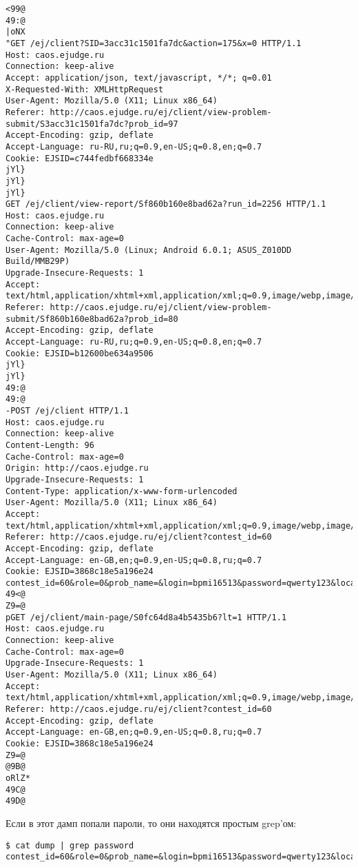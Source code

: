 \documentclass{article}
\begin{document}
\begin{verbatim}
<99@
49:@
|oNX
"GET /ej/client?SID=3acc31c1501fa7dc&action=175&x=0 HTTP/1.1
Host: caos.ejudge.ru
Connection: keep-alive
Accept: application/json, text/javascript, */*; q=0.01
X-Requested-With: XMLHttpRequest
User-Agent: Mozilla/5.0 (X11; Linux x86_64) 
Referer: http://caos.ejudge.ru/ej/client/view-problem-submit/S3acc31c1501fa7dc?prob_id=97
Accept-Encoding: gzip, deflate
Accept-Language: ru-RU,ru;q=0.9,en-US;q=0.8,en;q=0.7
Cookie: EJSID=c744fedbf668334e
jYl}
jYl}
jYl}
GET /ej/client/view-report/Sf860b160e8bad62a?run_id=2256 HTTP/1.1
Host: caos.ejudge.ru
Connection: keep-alive
Cache-Control: max-age=0
User-Agent: Mozilla/5.0 (Linux; Android 6.0.1; ASUS_Z010DD Build/MMB29P)
Upgrade-Insecure-Requests: 1
Accept: text/html,application/xhtml+xml,application/xml;q=0.9,image/webp,image/apng,*/*;q=0.8
Referer: http://caos.ejudge.ru/ej/client/view-problem-submit/Sf860b160e8bad62a?prob_id=80
Accept-Encoding: gzip, deflate
Accept-Language: ru-RU,ru;q=0.9,en-US;q=0.8,en;q=0.7
Cookie: EJSID=b12600be634a9506
jYl}
jYl}
49:@
49:@
-POST /ej/client HTTP/1.1
Host: caos.ejudge.ru
Connection: keep-alive
Content-Length: 96
Cache-Control: max-age=0
Origin: http://caos.ejudge.ru
Upgrade-Insecure-Requests: 1
Content-Type: application/x-www-form-urlencoded
User-Agent: Mozilla/5.0 (X11; Linux x86_64) 
Accept: text/html,application/xhtml+xml,application/xml;q=0.9,image/webp,image/apng,*/*;q=0.8
Referer: http://caos.ejudge.ru/ej/client?contest_id=60
Accept-Encoding: gzip, deflate
Accept-Language: en-GB,en;q=0.9,en-US;q=0.8,ru;q=0.7
Cookie: EJSID=3868c18e5a196e24
contest_id=60&role=0&prob_name=&login=bpmi16513&password=qwerty123&locale_id=0&action_2=Log+in
49<@
Z9=@
pGET /ej/client/main-page/S0fc64d8a4b5435b6?lt=1 HTTP/1.1
Host: caos.ejudge.ru
Connection: keep-alive
Cache-Control: max-age=0
Upgrade-Insecure-Requests: 1
User-Agent: Mozilla/5.0 (X11; Linux x86_64) 
Accept: text/html,application/xhtml+xml,application/xml;q=0.9,image/webp,image/apng,*/*;q=0.8
Referer: http://caos.ejudge.ru/ej/client?contest_id=60
Accept-Encoding: gzip, deflate
Accept-Language: en-GB,en;q=0.9,en-US;q=0.8,ru;q=0.7
Cookie: EJSID=3868c18e5a196e24
Z9=@
@9B@
oRlZ*
49C@
49D@
\end{verbatim}
\fontsize{10}{10}\selectfont
Если в этот дамп попали пароли, то они находятся простым grep'ом:
\begin{verbatim}
$ cat dump | grep password
contest_id=60&role=0&prob_name=&login=bpmi16513&password=qwerty123&locale_id=0&action_2=Log+in
\end{verbatim}
\newpage
\end{document}

